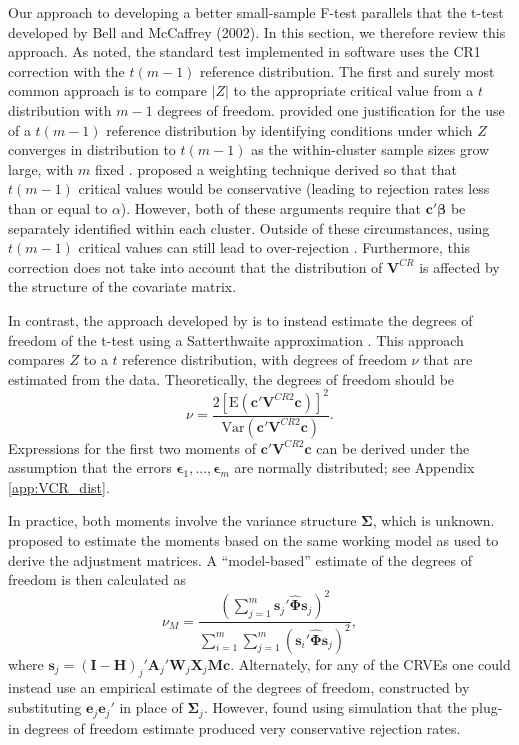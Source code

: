 \documentclass[12pt]{article}\usepackage[]{graphicx}\usepackage[]{color}
\newcommand{\E}{\text{E}}
\newcommand{\Var}{\text{Var}}
\newcommand{\bm}{\mathbf}
\newcommand{\bs}{\boldsymbol}
\begin{document}
Our approach to developing a better small-sample F-test parallels that the t-test developed by Bell and McCaffrey (2002). 
In this section, we therefore review this approach. As noted, the standard test implemented in software uses the CR1 correction with the $t(m - 1)$ reference distribution. 
The first and surely most common approach is to compare $|Z|$ to the appropriate critical value from a $t$ distribution with $m - 1$ degrees of freedom. 
\citet{Hansen2007asymptotic} provided one justification for the use of a $t(m-1)$ reference distribution by identifying conditions under which $Z$ converges in distribution to $t(m-1)$ as the within-cluster sample sizes grow large, with $m$ fixed \citep[see also][]{Donald2007inference}. 
\citet{Ibragimov2010tstatistic} proposed a weighting technique derived so that that $t(m-1)$ critical values would be conservative (leading to rejection rates less than or equal to $\alpha$).
However, both of these arguments require that $\bm{c}'\bs\beta$ be separately identified within each cluster. 
Outside of these circumstances, using $t(m-1)$ critical values can still lead to over-rejection \citep{Cameron2015practitioners}. 
Furthermore, this correction does not take into account that the distribution of $\bm{V}^{CR}$ is affected by the structure of the covariate matrix. 

In contrast, the approach developed by \citet{McCaffrey2001generalizations} is to instead estimate the degrees of freedom of the t-test using a Satterthwaite approximation \citep{Satterthwaite1946approximate}.
This approach compares $Z$ to a $t$ reference distribution, with degrees of freedom $\nu$ that are estimated from the data. 
Theoretically, the degrees of freedom should be 
\begin{equation}
\label{eq:nu_Satterthwaite}
\nu = \frac{2\left[\E\left(\bm{c}'\bm{V}^{CR2}\bm{c}\right)\right]^2}{\Var\left(\bm{c}'\bm{V}^{CR2}\bm{c}\right)}.
\end{equation}
Expressions for the first two moments of $\bm{c}'\bm{V}^{CR2}\bm{c}$ can be derived under the assumption that the errors $\bs\epsilon_1,...,\bs\epsilon_m$ are normally distributed; see Appendix \ref{app:VCR_dist}. 

In practice, both moments involve the variance structure $\bs\Sigma$, which is unknown. 
\citet{McCaffrey2001generalizations} proposed to estimate the moments based on the same working model as used to derive the adjustment matrices. 
A ``model-based'' estimate of the degrees of freedom is then calculated as 
\begin{equation}
\nu_{M} = \frac{\left(\sum_{j=1}^m \bm{s}_j' \hat{\bs\Phi} \bm{s}_j\right)^2}{\sum_{i=1}^m \sum_{j=1}^m \left(\bm{s}_i' \hat{\bs\Phi} \bm{s}_j\right)^2},
\end{equation}
where $\bm{s}_j = \left(\bm{I} - \bm{H}\right)_j'\bm{A}_j'\bm{W}_j\bm{X}_j\bm{M}\bm{c}$. 
Alternately, for any of the CRVEs one could instead use an empirical estimate of the degrees of freedom, constructed by substituting $\bm{e}_j \bm{e}_j'$ in place of $\bs\Sigma_j$. 
However, \citet{Bell2002bias} found using simulation that the plug-in degrees of freedom estimate produced very conservative rejection rates. 
\end{document}
